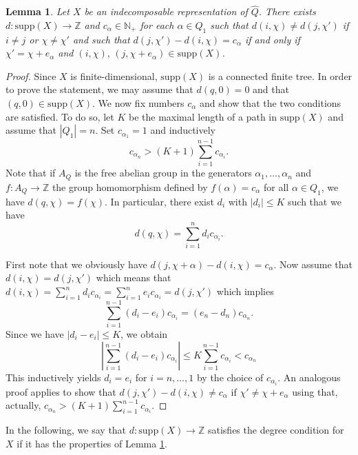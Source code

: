 \documentclass{amsart}
\newtheorem{lemma}[theorem]{Lemma}
\newcommand{\ZZ}{\mathbb{Z}}
\begin{document}
\begin{lemma}\label{degreecondition} Let $X$ be an indecomposable representation of $\hat Q$. There exists $d:\mathrm{supp} (X)\to\ZZ$ and $c_\alpha\in\mathbb N_+$ for each $\alpha\in Q_1$ such that $d(i,\chi)\ne d(j,\chi')$ if $i\neq j$ or $\chi\neq \chi'$ and such that $d(j,\chi')-d(i,\chi)=c_\alpha$ if and only if $\chi'=\chi+e_\alpha$ and $(i,\chi),\,(j,\chi+e_\alpha)\in \mathrm{supp}(X)$. 
\end{lemma}
\begin{proof}
Since $X$ is finite-dimensional, $\mathrm{supp}( X)$ is a connected finite tree. In order to prove the statement, we may assume that $d(q,0)=0$ and that $(q,0)\in \mathrm{supp}(X)$. We now fix numbers $c_\alpha$ and show that the two conditions are satisfied. To do so, let $K$ be the maximal length of a path in $\mathrm{supp}(X)$ and assume that $|Q_1|=n$. Set $c_{\alpha_1}=1$ and inductively 
\[c_{\alpha_n}> (K+1)\sum_{i=1}^{n-1}c_{\alpha_i}.\]
Note that if $A_Q$ is the free abelian group in the generators $\alpha_1,\ldots,\alpha_n$ and $f:A_Q\to \ZZ$ the group homomorphism defined by $f(\alpha)=c_\alpha$ for all $\alpha\in Q_1$,  we have $d(q,\chi)=f(\chi)$. In particular, there exist $d_i$ with $|d_i|\leq K$ such that we have
\[d(q,\chi)=\sum_{i=1}^nd_ic_{\alpha_i}.\]

First note that we obviously have $d(j,\chi+\alpha)-d(i,\chi)=c_\alpha$. Now assume that $d(i,\chi)=d(j,\chi')$ which means that $d(i,\chi)=\sum_{i=1}^{n}d_ic_{\alpha_i}=\sum_{i=1}^{n}e_ic_{\alpha_i}=d(j,\chi')$
which implies
\[\sum_{i=1}^{n-1}(d_i-e_i)c_{\alpha_i}=(e_{n}-d_{n})c_{\alpha_{n}}.\]
Since we have $|d_i-e_i|\leq K$, we obtain $$|\sum_{i=1}^{n-1}(d_i-e_i)c_{\alpha_i}|\leq K\sum_{i=1}^{n-1}c_{\alpha_i}<c_{\alpha_n}$$
This inductively yields $d_i=e_i$ for $i=n,\ldots,1$ by the choice of $c_{\alpha_{i}}$. An analogous proof applies to show that $d(j,\chi')-d(i,\chi)\neq c_\alpha$ if $\chi'\neq \chi+e_\alpha$ using that, actually, $c_{\alpha_n}> (K+1)\sum_{i=1}^{n-1}c_{\alpha_i}$. 

\end{proof}
In the following, we say that $d:\mathrm{supp}(X)\to\ZZ$ satisfies the degree condition for $X$ if it has the properties of Lemma \ref{degreecondition}.
\end{document}
